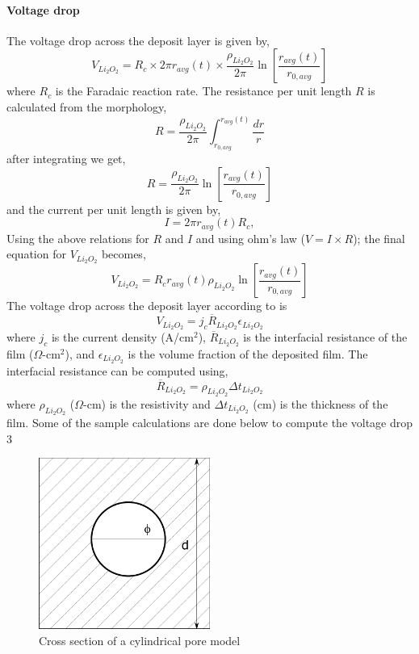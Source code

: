 \documentclass[12pt]{book}
\begin{document}
\paragraph{Voltage drop} The voltage drop across the deposit layer is given by,
\begin{equation}
V_{Li_2O_2} = R_c\times 2\pi r_{avg}\left(t\right) \times \frac{\rho_{Li_2O_2}}{2\pi}\ln{\left[\frac{r_{avg}\left(t\right)}{r_{0,avg}}\right]}
\end{equation}
where $R_c$ is the Faradaic reaction rate. The resistance per unit length $R$ is calculated from the morphology,
\begin{equation}
R = \frac{\rho_{Li_2O_2}}{2\pi}\int_{r_{0,avg}}^{r_{avg}\left(t\right)}\frac{dr}{r}
\end{equation}
after integrating we get,
\begin{equation}
R = \frac{\rho_{Li_2O_2}}{2\pi}\ln{\left[\frac{r_{avg}\left(t\right)}{r_{0,avg}}\right]}
\end{equation}
and the current per unit length is given by,
\begin{equation}
I = 2\pi r_{avg}\left(t\right)  R_c,
\end{equation}
Using the above relations for $R$ and $I$ and using ohm's law ($V=I\times R$); the final equation for $V_{Li_2O_2}$ becomes,
\begin{equation}
V_{Li_2O_2} = R_c r_{avg}\left(t\right)  \rho_{Li_2O_2}\ln{\left[\frac{r_{avg}\left(t\right)}{r_{0,avg}}\right]}
\end{equation}
The voltage drop across the deposit layer according to \cite{Sahapatsombut2013}  is 
\begin{equation}
V_{Li_2O_2}=j_c \overline{R}_{Li_2O_2}\epsilon_{Li_2O_2} 
\end{equation}
where $j_c$ is the current density (A/cm$^2$), $\overline{R}_{Li_2O_2}$ is the interfacial resistance of the film ($\Omega$-cm$^2$), and $\epsilon_{Li_2O_2} $ is the volume fraction of the deposited film. The interfacial resistance can be computed using,
\begin{equation}
\overline{R}_{Li_2O_2} =\rho_{Li_2O_2} \Delta t_{Li_2O_2}
\end{equation}
where $\rho_{Li_2O_2}$ ($\Omega$-cm) is the resistivity and $\Delta t_{Li_2O_2}$ (cm) is the thickness of the film.
Some of the sample calculations are done below to compute the voltage drop 
3\begin{figure}[htb]
	\centering
	\includegraphics[width=0.5\textwidth]{figures/cylinder_pore_model}
	\caption{Cross section of a cylindrical pore model}
\end{figure}
\end{document}
